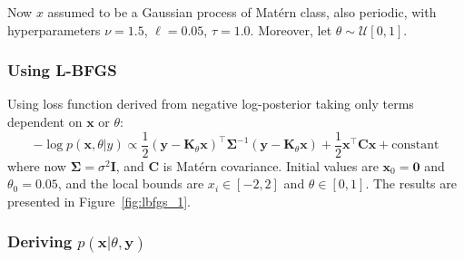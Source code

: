 \documentclass[times, a4paper, 12pt, onecolumn, oneside]{article}
\newcommand{\bm}{\boldsymbol}
\begin{document}
Now $x$ assumed to be a Gaussian process of Matérn class, also periodic, with hyperparameters $\nu=1.5$, $\ell=0.05$, $\tau=1.0$. Moreover, let $\theta \sim \mathcal{U}[0, 1]$.

\subsubsection{Using L-BFGS}

Using loss function derived from negative log-posterior taking only terms dependent on $\bm{x}$ or $\theta$:
$$
-\log p(\bm{x}, \theta | y) \propto \frac{1}{2}(\bm{y} - \bm{K}_\theta \bm{x})^\intercal \bm{\Sigma}^{-1}(\bm{y} - \bm{K}_\theta \bm{x}) + \frac{1}{2} \bm{x}^\intercal \bm{C} \bm{x} + \text{constant}
$$
where now $\bm{\Sigma} = \sigma^2 \bm{I}$, and $\bm{C}$ is Matérn covariance. Initial values are $\bm{x}_0 = \bm{0}$ and $\theta_0 = 0.05$, and the local bounds are $x_i \in [-2, 2]$ and $\theta \in [0, 1]$. The results are presented in Figure~\ref{fig:lbfgs_1}.

\subsubsection{Deriving $p(\bm{x} | \theta, \bm{y})$}
\end{document}
